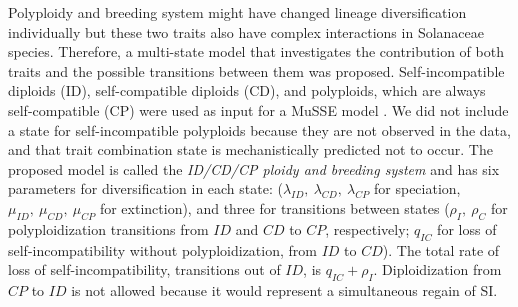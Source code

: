 Polyploidy and breeding system might have changed lineage diversification individually but these two traits also have complex interactions in Solanaceae species. Therefore, a multi-state model that investigates the contribution of both traits and the possible transitions between them was proposed.  %
Self-incompatible diploids (ID), self-compatible diploids (CD), and polyploids, which are always self-compatible (CP) were used as input for a MuSSE model \citep{fitzjohn_2012}.
We did not include a state for self-incompatible polyploids because they are not observed in the data, and  that trait combination state is mechanistically predicted not to occur.
The proposed model is called the \textit{ID/CD/CP ploidy and breeding system} and has six parameters for diversification in each state: ($\lambda_{ID},\ \lambda_{CD},\ \lambda_{CP}$ for speciation, $\mu_{ID},\ \mu_{CD},\ \mu_{CP}$ for extinction), and three for transitions between states ($\rho_I,\ \rho_C$ for polyploidization transitions from $ID$ and $CD$ to $CP$, respectively; $q_{IC}$ for loss of self-incompatibility without polyploidization, from $ID$ to $CD$).
The total rate of loss of self-incompatibility, \ie transitions out of $ID$, is $q_{IC} + \rho_I$.
Diploidization from $CP$ to $ID$ is not allowed because it would represent a simultaneous regain of SI.


